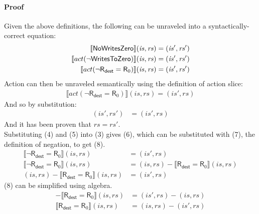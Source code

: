 \documentclass[12pt, letterpaper]{article}
\begin{document}
\paragraph{Proof}
    Given the above definitions, the following can be unraveled into a syntactically-correct equation:
\begin{align}
    \setcounter{equation}{0}
    \llbracket \mathsf{NoWritesZero} \rrbracket (\mathit{is}, \mathit{rs}) 
    &=
    (\mathit{is}', \mathit{rs}')
    \\
    \llbracket act(\neg \mathsf{WritesToZero}) \rrbracket (\mathit{is}, \mathit{rs}) 
    &=
    (\mathit{is}', \mathit{rs}')
    \\
    \llbracket act(\neg \mathsf{R}_{\mathsf{dest}} = \mathsf{R}_0) \rrbracket (\mathit{is}, \mathit{rs}) 
    &=
    (\mathit{is}', \mathit{rs}')
\end{align}
    Action can then be unraveled semantically using the definition of action slice:
\begin{align}
    \llbracket act(\neg \mathsf{R}_{\mathsf{dest}} = \mathsf{R}_0) \rrbracket (\mathit{is}, \mathit{rs}) 
    =
    (\mathit{is}', \mathit{rs})
\end{align}
    And so by substitution:
\begin{align}
    (\mathit{is}', \mathit{rs}')
    &=
    (\mathit{is}', \mathit{rs})
\end{align}
    And it has been proven that $\mathit{rs} = \mathit{rs'}$.\\
    Substituting (4) and (5) into (3) gives (6), which can be substituted with (7), the definition of negation, to get (8). 
\begin{align}
    \llbracket \neg \mathsf{R}_{\mathsf{dest}} = \mathsf{R}_0 \rrbracket (\mathit{is}, \mathit{rs}) 
    &=
    (\mathit{is}', \mathit{rs})\\
    \llbracket \neg \mathsf{R}_{\mathsf{dest}} = \mathsf{R}_0 \rrbracket (\mathit{is}, \mathit{rs}) 
    &=
    (\mathit{is}, \mathit{rs}) - \llbracket \mathsf{R}_{\mathsf{dest}} = \mathsf{R}_0 \rrbracket (\mathit{is}, \mathit{rs})\\ %
    (\mathit{is}, \mathit{rs}) - \llbracket \mathsf{R}_{\mathsf{dest}} = \mathsf{R}_0 \rrbracket (\mathit{is}, \mathit{rs}) 
    &=
    (\mathit{is}', \mathit{rs})
\end{align}
    (8) can be simplified using algebra.
\begin{align}    
    - \llbracket \mathsf{R}_{\mathsf{dest}} = \mathsf{R}_0 \rrbracket (\mathit{is}, \mathit{rs}) 
    &=
    (\mathit{is}', \mathit{rs}) - (\mathit{is}, \mathit{rs})
    \\
    \llbracket \mathsf{R}_{\mathsf{dest}} = \mathsf{R}_0 \rrbracket (\mathit{is}, \mathit{rs}) 
    &=
    (\mathit{is}, \mathit{rs}) - (\mathit{is}', \mathit{rs})
\end{align}
\end{document}
